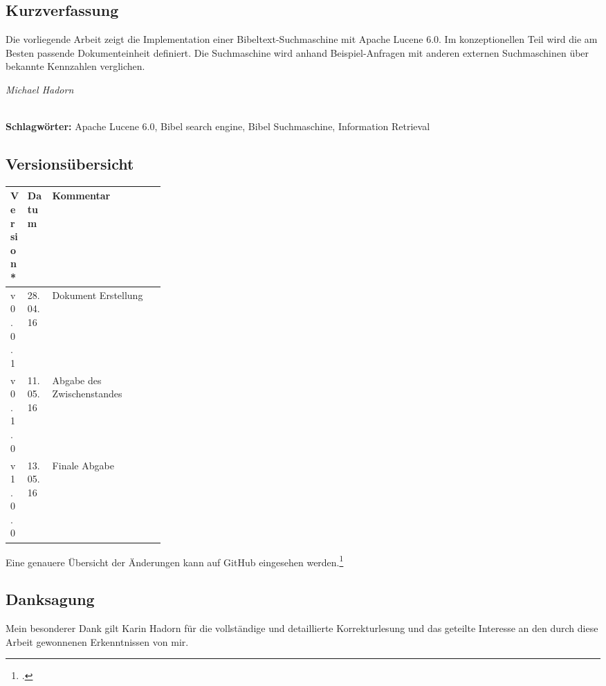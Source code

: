 
\subsection*{Kurzverfassung}
Die vorliegende Arbeit zeigt die Implementation einer Bibeltext-Suchmaschine mit Apache Lucene 6.0.
Im konzeptionellen Teil wird die am Besten passende Dokumenteinheit definiert.
Die Suchmaschine wird anhand Beispiel-Anfragen mit anderen externen Suchmaschinen über bekannte Kennzahlen verglichen.

\begin{flushright}
	\textit{Michael Hadorn}	
\end{flushright}

\vfill

%
\mbox{}\\[0.5\baselineskip]\noindent
\textbf{Schlagwörter:} 
Apache Lucene 6.0, Bibel search engine, Bibel Suchmaschine, Information Retrieval

\newpage
\subsection*{Versionsübersicht}
\begin{center}
	\centering
	\small\renewcommand{\arraystretch}{1.4}
	\begin{tabularx}{1.0\textwidth}{ R{0.1\linewidth} | R{0.16\linewidth} | X  }%
		\hline
		\textbf{Version*} & \textbf{Datum} & \textbf{Kommentar}\\
		\hline\hline
		v0.0.1 & 28.04.16 & Dokument Erstellung \\
		v0.1.0 & 11.05.16 & Abgabe des Zwischenstandes \\
		v1.0.0 & 13.05.16 & Finale Abgabe \\
		\hline\hline
	\end{tabularx}
\end{center}
\vspace{-1.0\baselineskip}
{\footnotesize * Eine genauere Übersicht der Änderungen kann auf GitHub eingesehen werden.\footcite{github_bibleSearch_2016-05-07}}

\vfill

\subsection*{Danksagung}
Mein besonderer Dank gilt Karin Hadorn für die vollständige und detaillierte Korrekturlesung und das geteilte Interesse an den durch diese Arbeit gewonnenen Erkenntnissen von mir.\\
